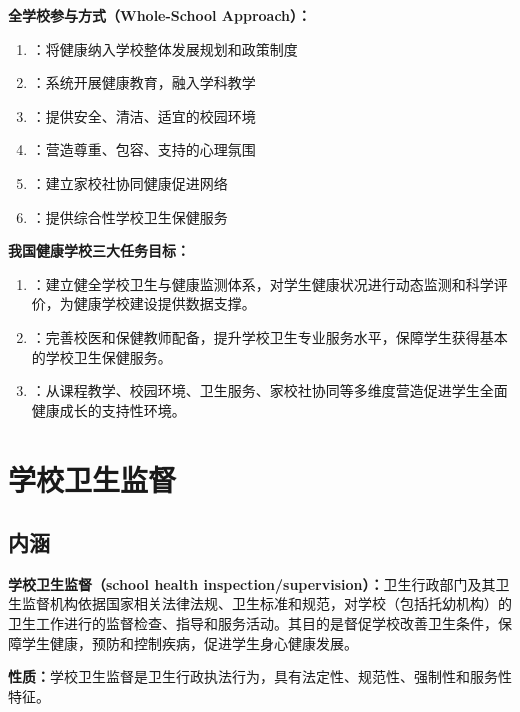 \begin{keybox}
\textbf{全学校参与方式（Whole-School Approach）：}
\begin{enumerate}[leftmargin=*]
    \item {}：将健康纳入学校整体发展规划和政策制度
    \item {}：系统开展健康教育，融入学科教学
    \item {}：提供安全、清洁、适宜的校园环境
    \item {}：营造尊重、包容、支持的心理氛围
    \item {}：建立家校社协同健康促进网络
    \item {}：提供综合性学校卫生保健服务
\end{enumerate}
\end{keybox}

\begin{keybox}
\textbf{我国健康学校三大任务目标：}
\begin{enumerate}[leftmargin=*]
    \item {}：建立健全学校卫生与健康监测体系，对学生健康状况进行动态监测和科学评价，为健康学校建设提供数据支撑。
    \item {}：完善校医和保健教师配备，提升学校卫生专业服务水平，保障学生获得基本的学校卫生保健服务。
    \item {}：从课程教学、校园环境、卫生服务、家校社协同等多维度营造促进学生全面健康成长的支持性环境。
\end{enumerate}
\end{keybox}

\section{学校卫生监督}

\subsection{内涵}

\begin{defbox}
\textbf{学校卫生监督（school health inspection/supervision）：}卫生行政部门及其卫生监督机构依据国家相关法律法规、卫生标准和规范，对学校（包括托幼机构）的卫生工作进行的监督检查、指导和服务活动。其目的是督促学校改善卫生条件，保障学生健康，预防和控制疾病，促进学生身心健康发展。

\textbf{性质：}学校卫生监督是卫生行政执法行为，具有法定性、规范性、强制性和服务性特征。
\end{defbox}

